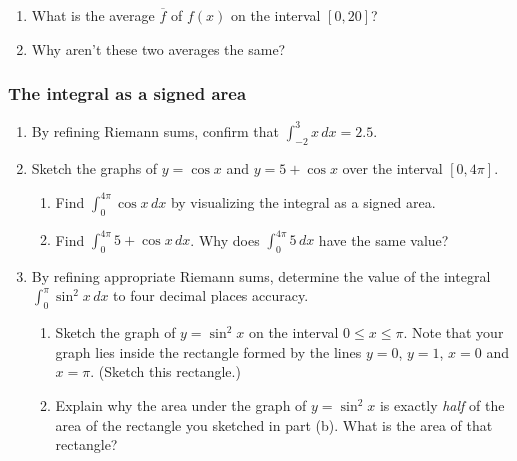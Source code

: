 \begin{enumerate}
  \begin{enumerate}
  \item What is the average $\overline{f}$ of $f(x)$ on the interval $[0,
  20]$?

  \item Why aren't these two averages the same?

\label{average-end}

\end{enumerate}
\end{enumerate}
\subsubsection{The integral as a signed area}
\label{subsubsec:the-integral-as-a-signed-area}




\begin{enumerate}
\item By refining Riemann sums, confirm that ${\displaystyle
  \int_{-2}^3 x \, dx = 2.5}$.


\item Sketch the graphs of $y = \cos{x}$ and $y = 5 + \cos{x}$ over
the interval $[0, 4\pi]$.

  \begin{enumerate}
  \item Find ${\displaystyle \int_0^{4\pi} \cos{x} \, dx}$ by visualizing
the integral as a signed area.

  \item Find ${\displaystyle \int_0^{4\pi} 5 + \cos{x} \, dx}$.  Why does
${\displaystyle \int_0^{4\pi} 5 \, dx}$ have the same value?


\end{enumerate}
\item By refining appropriate Riemann sums, determine the value of the
integral ${\displaystyle \int_0^{\pi} \sin^2{x}\,dx}$ to four decimal
places accuracy.

  \begin{enumerate}
  \item Sketch the graph of $y = \sin^2{x}$ on the interval $0 \leq x
\leq \pi$.  Note that your graph lies inside the rectangle formed by
the lines $y = 0$, $y = 1$, $x = 0$ and $x = \pi$.  (Sketch this
rectangle.)


  \item Explain why the area under the graph of $y = \sin^2{x}$ is
exactly {\em half\/} of the area of the rectangle you sketched in part
(b).  What is the area of that rectangle?


\end{enumerate}
\end{enumerate}
